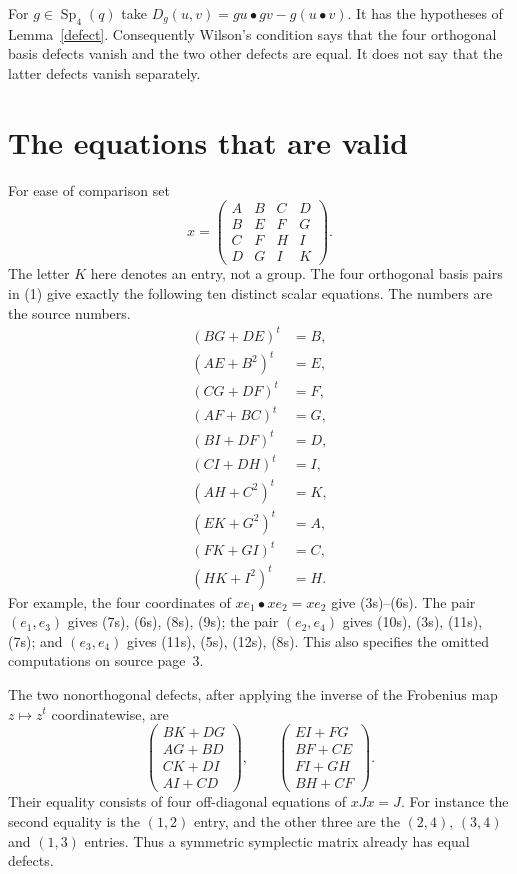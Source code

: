\documentclass[11pt,a4paper]{article}
\newcommand{\Sp}{\operatorname{Sp}}
\begin{document}
For $g\in\Sp_4(q)$ take
$D_g(u,v)=gu\bullet gv-g(u\bullet v)$.
It has the hypotheses of Lemma~\ref{defect}. Consequently Wilson's
condition says that the four orthogonal basis defects vanish and
the two other defects are equal. It does not say that the latter
defects vanish separately.

\section{The equations that are valid}
For ease of comparison set
\[
 x=\begin{pmatrix}
 A&B&C&D\\B&E&F&G\\C&F&H&I\\D&G&I&K
 \end{pmatrix}.
 \tag{4}
\]
The letter $K$ here denotes an entry, not a group. The four
orthogonal basis pairs in (1) give exactly the following ten
distinct scalar equations. The numbers are the source numbers.
\begin{align}
 (BG+DE)^t&=B,\tag{3s}\\
 (AE+B^2)^t&=E,\tag{4s}\\
 (CG+DF)^t&=F,\tag{5s}\\
 (AF+BC)^t&=G,\tag{6s}\\
 (BI+DF)^t&=D,\tag{7s}\\
 (CI+DH)^t&=I,\tag{8s}\\
 (AH+C^2)^t&=K,\tag{9s}\\
 (EK+G^2)^t&=A,\tag{10s}\\
 (FK+GI)^t&=C,\tag{11s}\\
 (HK+I^2)^t&=H.\tag{12s}
\end{align}
For example, the four coordinates of $xe_1\bullet xe_2=xe_2$
give (3s)--(6s). The pair $(e_1,e_3)$ gives (7s), (6s), (8s),
(9s); the pair $(e_2,e_4)$ gives (10s), (3s), (11s), (7s);
and $(e_3,e_4)$ gives (11s), (5s), (12s), (8s).
This also specifies the omitted computations on source page~3.

The two nonorthogonal defects, after applying the inverse of the
Frobenius map $z\mapsto z^t$ coordinatewise, are
\[
 \begin{pmatrix}BK+DG\\AG+BD\\CK+DI\\AI+CD\end{pmatrix},
 \qquad
 \begin{pmatrix}EI+FG\\BF+CE\\FI+GH\\BH+CF\end{pmatrix}.
 \tag{5}
\]
Their equality consists of four off-diagonal equations of $xJx=J$.
For instance the second equality is the $(1,2)$ entry, and the
other three are the $(2,4)$, $(3,4)$ and $(1,3)$ entries.
Thus a symmetric symplectic matrix already has equal defects.
\end{document}
